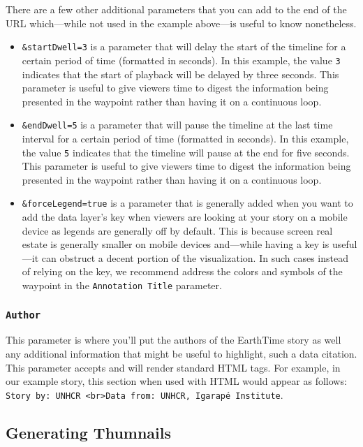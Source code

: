 \documentclass[
  12pt,
]{krantz}
\begin{document}
There are a few other additional parameters that you can add to the end of the URL which---while not used in the example above---is useful to know nonetheless.

\begin{itemize}
\item
  \texttt{\&startDwell=3} is a parameter that will delay the start of the timeline for a certain period of time (formatted in seconds). In this example, the value \texttt{3} indicates that the start of playback will be delayed by three seconds. This parameter is useful to give viewers time to digest the information being presented in the waypoint rather than having it on a continuous loop.
\item
  \texttt{\&endDwell=5} is a parameter that will pause the timeline at the last time interval for a certain period of time (formatted in seconds). In this example, the value \texttt{5} indicates that the timeline will pause at the end for five seconds. This parameter is useful to give viewers time to digest the information being presented in the waypoint rather than having it on a continuous loop.
\item
  \texttt{\&forceLegend=true} is a parameter that is generally added when you want to add the data layer's key when viewers are looking at your story on a mobile device as legends are generally off by default. This is because screen real estate is generally smaller on mobile devices and---while having a key is useful---it can obstruct a decent portion of the visualization. In such cases instead of relying on the key, we recommend address the colors and symbols of the waypoint in the \texttt{Annotation\ Title} parameter.
\end{itemize}

\hypertarget{author}{%
\subsubsection*{\texorpdfstring{\texttt{Author}}{Author}}\label{author}}


This parameter is where you'll put the authors of the EarthTime story as well any additional information that might be useful to highlight, such a data citation. This parameter accepts and will render standard HTML tags. For example, in our example story, this section when used with HTML would appear as follows: \texttt{Story\ by:\ UNHCR\ \textless{}br\textgreater{}Data\ from:\ UNHCR,\ Igarapé\ Institute}.

\hypertarget{generating-thumnails}{%
\subsection{Generating Thumnails}\label{generating-thumnails}}
\end{document}
